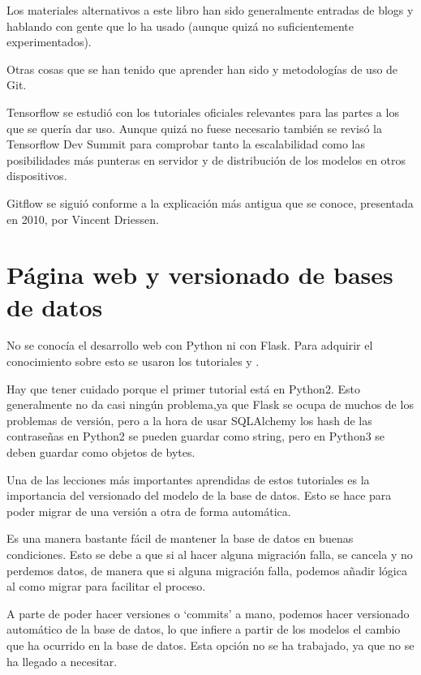 Los materiales alternativos a este libro han sido  generalmente entradas de blogs y hablando con gente que lo ha usado \cite{fow06, dancont} (aunque quizá no suficientemente experimentados). 

Otras cosas que se han tenido que aprender han sido  y metodologías de uso de Git\cite{vin10}. 

Tensorflow se estudió con los tutoriales oficiales relevantes para las partes a los que se quería dar uso. Aunque quizá no fuese necesario también se revisó la Tensorflow Dev Summit \cite{tfds} para comprobar tanto la escalabilidad como las posibilidades más punteras en servidor y de distribución de los modelos en otros dispositivos.

Gitflow se siguió conforme a la explicación más antigua que se conoce, presentada en 2010, por Vincent Driessen\cite{vin10}.

\section{Página web y versionado de bases de datos}

No se conocía el desarrollo web con Python ni con Flask. Para adquirir el conocimiento sobre esto se usaron los tutoriales  y .

Hay que tener cuidado porque el primer tutorial está en Python2. Esto generalmente no da casi ningún problema,ya que Flask se ocupa de muchos de los problemas de versión, pero a la hora de usar SQLAlchemy los hash de las contraseñas en Python2 se pueden guardar como string, pero en Python3 se deben guardar como objetos de bytes.

Una de las lecciones más importantes aprendidas de estos tutoriales es la importancia del versionado del modelo de la base de datos. Esto se hace para poder migrar de una versión a otra de forma automática. 

Es una manera bastante fácil de mantener la base de datos en buenas condiciones. Esto se debe a que si al hacer alguna migración falla, se cancela y no perdemos datos, de manera que si alguna migración falla, podemos añadir lógica al como migrar para facilitar el proceso.

A parte de poder hacer versiones o `commits' a mano, podemos hacer versionado automático de la base de datos, lo que infiere a partir de los modelos el cambio que ha ocurrido en la base de datos. Esta opción no se ha trabajado, ya que no se ha llegado a necesitar.

